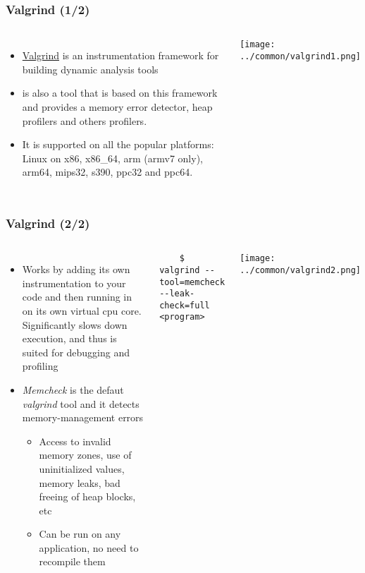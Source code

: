 \begin{frame}
  \frametitle{Valgrind (1/2)}
  \begin{columns}[T]
    \begin{itemize}
      \item \href{https://valgrind.org/}{Valgrind} is an instrumentation
            framework for building dynamic analysis tools
      \item {} is also a tool that is based on this framework
            and provides a memory error detector, heap profilers and others
            profilers.
      \item It is supported on all the popular platforms: Linux on x86, x86\_64,
            arm (armv7 only), arm64, mips32, s390, ppc32 and ppc64.
    \end{itemize}
    \texttt{[image: ../common/valgrind1.png]}
  \end{columns}
\end{frame}

\begin{frame}[fragile]
  \frametitle{Valgrind (2/2)}
  \begin{columns}[T]
    \begin{itemize}
      \item Works by adding its own instrumentation to your code and
            then running in on its own virtual cpu core. Significantly slows
            down execution, and thus is suited for debugging and profiling
      \item {\em Memcheck} is the defaut {\em valgrind} tool and it detects
            memory-management errors
      \begin{itemize}
        \item Access to invalid memory zones, use of uninitialized values,
              memory leaks, bad freeing of heap blocks, etc
        \item Can be run on any application, no need to recompile them
      \end{itemize}
    \end{itemize}
      \begin{block}{}
        \begin{verbatim}
    $ valgrind --tool=memcheck --leak-check=full <program>
        \end{verbatim}
      \end{block}
    \texttt{[image: ../common/valgrind2.png]}
  \end{columns}
\end{frame}

